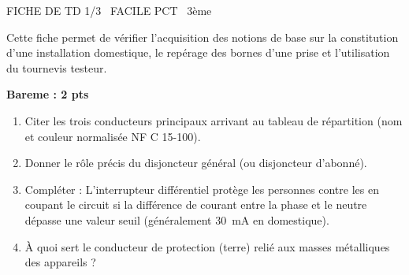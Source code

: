 \documentclass[11pt]{article}
\begin{document}
\begin{tcolorbox}[enhanced,colback=popink,colframe=popink,arc=10pt,boxrule=0pt,left=12pt,right=12pt,top=9pt,bottom=9pt]
{\color{white}\popxbold\small FICHE DE TD 1/3 \textbullet\ FACILE \hfill PCT \textbullet\ 3ème\par}
\end{tcolorbox}
\vspace{4pt}
Cette fiche permet de vérifier l'acquisition des notions de base sur la constitution d'une installation domestique, le repérage des bornes d'une prise et l'utilisation du tournevis testeur.

\begin{exercice}
\textbf{Bareme : 2 pts}
\begin{enumerate}
    \item Citer les trois conducteurs principaux arrivant au tableau de répartition (nom et couleur normalisée NF C 15-100).
    \item Donner le rôle précis du disjoncteur général (ou disjoncteur d'abonné).
    \item Compléter : L'interrupteur différentiel protège les personnes contre les \underline{\hspace{4cm}} en coupant le circuit si la différence de courant entre la phase et le neutre dépasse une valeur seuil (généralement \SI{30}{mA} en domestique).
    \item À quoi sert le conducteur de protection (terre) relié aux masses métalliques des appareils ?
\end{enumerate}
\end{exercice}

\providecommand{\bareme}[1]{\par\textbf{\textit{Bareme : #1~pts}}\par\vspace{0.5\baselineskip}}
\end{document}
